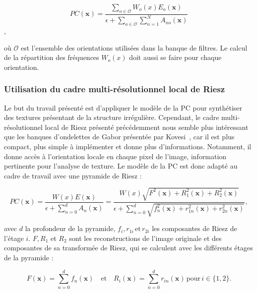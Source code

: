 \begin{equation}
    PC(\mathbf{x}) = \frac{\sum_{o\in \mathcal{O}} W_o(x)E_o(\mathbf{x})}{\epsilon + \sum_{o \in \mathcal{O}}\sum_{n=1}^{N} A_{no}(\mathbf{x})}
\end{equation},

où $\mathcal{O}$ est l'ensemble des orientations utilisées dans la banque de filtres. Le calcul de la répartition des fréquences $W_o(x)$ doit aussi se faire pour chaque orientation.

\subsubsection{Utilisation du cadre multi-résolutionnel local de Riesz}

Le but du travail présenté est d'appliquer le modèle de la PC pour synthétiser des textures présentant de la structure irrégulière. Cependant, le cadre multi-résolutionnel local de Riesz présenté précédemment nous semble plus intéressant que les banques d'ondelettes de Gabor présentée par Kovesi~\cite{kovesi_image_1995}, car il est plus compact, plus simple à implémenter et donne plus d'informations. Notamment, il donne accès à l'orientation locale en chaque pixel de l'image, information pertinente pour l'analyse de texture. Le modèle de la PC est donc adapté au cadre de travail avec une pyramide de Riesz :

\begin{equation}
    PC(\mathbf{x}) = \frac{W(x)E(\mathbf{x})}{\epsilon + \sum_{n=0}^{d} A_{n}(\mathbf{x})} = \frac{W(x)\sqrt{F^2(\mathbf{x})+R_1^2(\mathbf{x})+R_2^2(\mathbf{x})}}{\epsilon + \sum_{n=0}^{d} \sqrt{f_n^2(\mathbf{x}) + r_{1n}^2(\mathbf{x}) + r_{2n}^2(\mathbf{x})}},
\end{equation}

avec $d$ la profondeur de la pyramide, $f_i, r_{1i}\, \text{et}\, r_{2i}$ les composantes de Riesz de l'étage $i$. $F, R_1$ et $R_2$ sont les reconstructions de l'image originale et des composantes de sa transformée de Riesz, qui se calculent avec les différents étages de la pyramide :

\begin{equation}
    F(\mathbf{x}) = \sum_{n=0}^{d} f_n(\mathbf{x}) \quad \text{et} \quad R_i(\mathbf{x}) = \sum_{n=0}^{d} r_{in}(\mathbf{x})\, \text{pour}\, i \in \{1, 2\}.
\end{equation}

